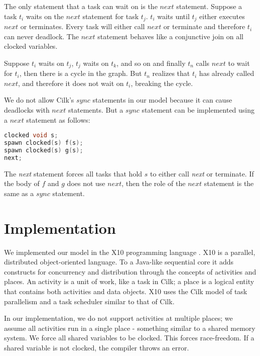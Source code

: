 \documentclass[10pt, conference, compsocconf]{IEEEtran}
\begin{document}
The only statement that a task can wait on is the $next$ statement.
Suppose a task $t_i$ waits on the $next$ statement for task $t_j$.
$t_i$ waits until $t_j$ either executes $next$ or terminates.
Every task will either call $next$ or terminate and therefore
$t_i$ can never deadlock.
The $next$ statement  behaves like a conjunctive join on 
all clocked variables.

Suppose $t_i$ waits on $t_j$, $t_j$ waits on $t_k$, and so on
and finally $t_n$ calls $next$ to wait for $t_i$, then there is a cycle in the 
graph. But $t_n$ realizes that $t_i$ has already called $next$, and therefore
it does not wait on $t_i$, breaking the cycle.  

We do not allow Cilk's $sync$ statements in our model because it can cause
deadlocks with $next$ statements.
But a $sync$ statement can be implemented using a $next$ statement as follows:
\begin{lstlisting}[language=c]
clocked void s;
spawn clocked(s) f(s);
spawn clocked(s) g(s);
next;
\end{lstlisting}

The \emph{next} statement forces all tasks that hold $s$ to either
call \emph{next} or terminate. If the body of $f$ and $g$ does not
use $next$, then the role of the $next$ statement is the same as a $sync$
statement.


\section{Implementation}
\label{sec:implementation}

We implemented our model in the X10 programming language \cite{charles2005x10}.
X10 is a parallel, distributed object-oriented language. 
To a Java-like sequential 
  core it adds constructs for concurrency and distribution through the 
concepts of activities and places. An activity is a unit of work, like a task in 
Cilk; a place is a logical entity that contains both activities and data objects.
X10 uses the Cilk model of task parallelism and a task scheduler similar to that
of Cilk.

In our implementation, we do not support activities at multiple places; we assume all activities run
in a single place - something similar to a shared memory system. 
We force all shared variables to be clocked. This forces
race-freedom. If a shared variable is not clocked, the compiler throws
an error.
\end{document}
